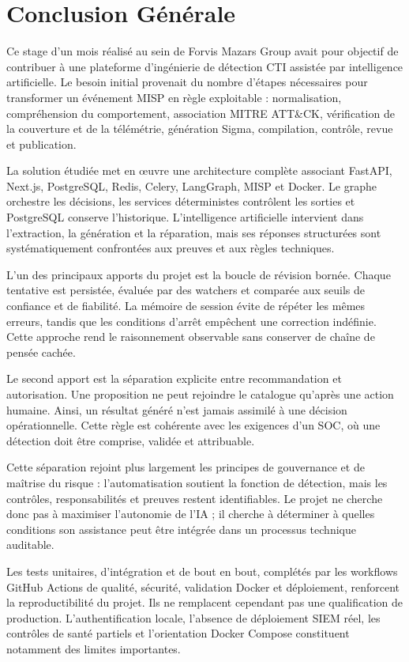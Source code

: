 \chapter*{Conclusion Générale}

Ce stage d'un mois réalisé au sein de Forvis Mazars Group avait pour objectif de contribuer à une plateforme d'ingénierie de détection CTI assistée par intelligence artificielle. Le besoin initial provenait du nombre d'étapes nécessaires pour transformer un événement MISP en règle exploitable : normalisation, compréhension du comportement, association MITRE ATT\&CK, vérification de la couverture et de la télémétrie, génération Sigma, compilation, contrôle, revue et publication.

La solution étudiée met en œuvre une architecture complète associant FastAPI, Next.js, PostgreSQL, Redis, Celery, LangGraph, MISP et Docker. Le graphe orchestre les décisions, les services déterministes contrôlent les sorties et PostgreSQL conserve l'historique. L'intelligence artificielle intervient dans l'extraction, la génération et la réparation, mais ses réponses structurées sont systématiquement confrontées aux preuves et aux règles techniques.

L'un des principaux apports du projet est la boucle de révision bornée. Chaque tentative est persistée, évaluée par des watchers et comparée aux seuils de confiance et de fiabilité. La mémoire de session évite de répéter les mêmes erreurs, tandis que les conditions d'arrêt empêchent une correction indéfinie. Cette approche rend le raisonnement observable sans conserver de chaîne de pensée cachée.

Le second apport est la séparation explicite entre recommandation et autorisation. Une proposition ne peut rejoindre le catalogue qu'après une action humaine. Ainsi, un résultat généré n'est jamais assimilé à une décision opérationnelle. Cette règle est cohérente avec les exigences d'un SOC, où une détection doit être comprise, validée et attribuable.

Cette séparation rejoint plus largement les principes de gouvernance et de maîtrise du risque : l'automatisation soutient la fonction de détection, mais les contrôles, responsabilités et preuves restent identifiables. Le projet ne cherche donc pas à maximiser l'autonomie de l'IA ; il cherche à déterminer à quelles conditions son assistance peut être intégrée dans un processus technique auditable.

Les tests unitaires, d'intégration et de bout en bout, complétés par les workflows GitHub Actions de qualité, sécurité, validation Docker et déploiement, renforcent la reproductibilité du projet. Ils ne remplacent cependant pas une qualification de production. L'authentification locale, l'absence de déploiement SIEM réel, les contrôles de santé partiels et l'orientation Docker Compose constituent notamment des limites importantes.


